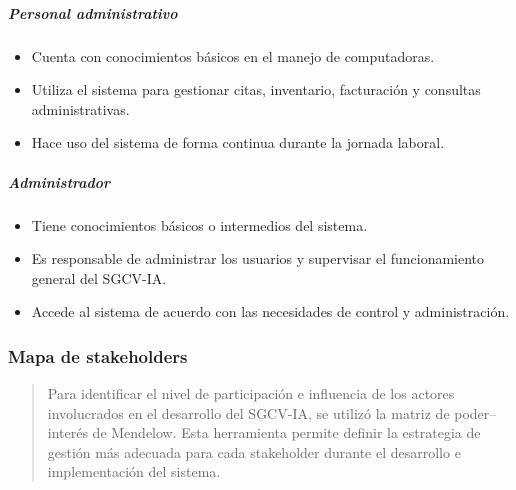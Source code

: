 \documentclass[
]{article}
\begin{document}
\subparagraph{Personal administrativo}\label{personal-administrativo}

\begin{itemize}
\item
  Cuenta con conocimientos básicos en el manejo de computadoras.
\item
  Utiliza el sistema para gestionar citas, inventario, facturación y
  consultas administrativas.
\item
  Hace uso del sistema de forma continua durante la jornada laboral.
\end{itemize}

\subparagraph{Administrador}\label{administrador}

\begin{itemize}
\item
  Tiene conocimientos básicos o intermedios del sistema.
\item
  Es responsable de administrar los usuarios y supervisar el
  funcionamiento general del SGCV-IA.
\item
  Accede al sistema de acuerdo con las necesidades de control y
  administración.
\end{itemize}

\subsubsection{Mapa de stakeholders}\label{mapa-de-stakeholders}

\begin{quote}
Para identificar el nivel de participación e influencia de los actores
involucrados en el desarrollo del SGCV-IA, se utilizó la matriz de
poder--interés de Mendelow. Esta herramienta permite definir la
estrategia de gestión más adecuada para cada stakeholder durante el
desarrollo e implementación del sistema.
\end{quote}
\end{document}
